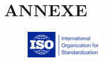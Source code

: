 \documentclass[
	11pt, %
	fleqn, %
	a4paper, %
]{LegrandOrangeBook}
\begin{document}
\newpage
\section{ANNEXE}
 \begin{figure}[H] %
	\centering %
	\includegraphics[width=0.3\textwidth]{Images/ISO.PNG} %

	\label{fig:placeholder} %
\end{figure}



{} %
\printindex %
\end{document}
